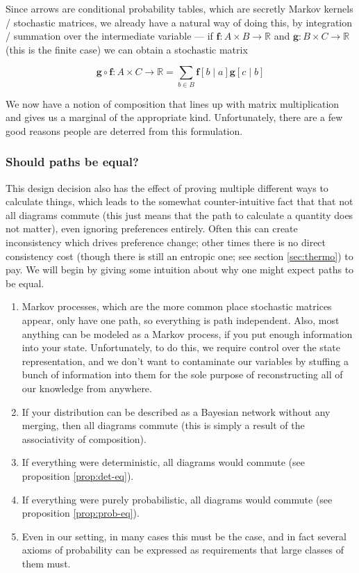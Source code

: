 \documentclass{article}
\begin{document}
	Since arrows are conditional probability tables, which are secretly Markov kernels / stochastic matrices, we already have a natural way of doing this, by integration / summation over the intermediate variable --- if $\mathbf f : A \times B \to \mathbb R$ and $\mathbf g : B \times C \to \mathbb R$ (this is the finite case) we can obtain a stochastic matrix
	
	\[\mathbf g\circ \mathbf f : A \times C \to \mathbb R =  \sum_{b \in B} \mathbf f[ b \mid a] \mathbf g[c \mid b] \]
	
	We now have a notion of composition that lines up with matrix multiplication and gives us a marginal of the appropriate kind. Unfortunately, there are a few good reasons people are deterred from this formulation. 
	

	
	\subsubsection{Should paths be equal?}
	
	This design decision also has the effect of proving multiple different ways to calculate things, which leads to the somewhat counter-intuitive fact that that not all diagrams commute (this just means that the path to calculate a quantity does not matter), even ignoring preferences entirely. Often this can create inconsistency which drives preference change; other times there is no direct consistency cost (though there is still an entropic one; see section \ref{sec:thermo}) to pay. We will begin by giving some intuition about why one might expect paths to be equal. 

	\begin{enumerate}
		\item Markov processes, which are the more common place stochastic matrices appear, only have one path, so everything is path independent. Also, most anything can be modeled as a Markov process, if you put enough information into your state. Unfortunately, to do this, we require control over the state representation, and we don't want to contaminate our variables by stuffing a bunch of information into them for the sole purpose of reconstructing all of our knowledge from anywhere.
		\item If your distribution can be described as a Bayesian network without any merging, then all diagrams commute (this is simply a result of the associativity of composition).
		\item If everything were deterministic, all diagrams would commute (see proposition \ref{prop:det-eq}).
		\item If everything were purely probabilistic, all diagrams would commute (see proposition \ref{prop:prob-eq}).
		\item Even in our setting, in many cases this must be the case, and in fact several axioms of probability can be expressed as requirements that large classes of them must.
	\end{enumerate}
\end{document}
